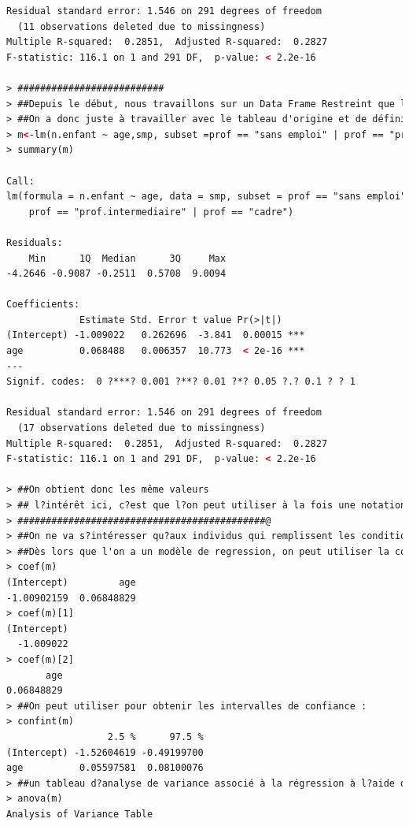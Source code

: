 \begin{lstlisting}[language=html]
Residual standard error: 1.546 on 291 degrees of freedom
  (11 observations deleted due to missingness)
Multiple R-squared:  0.2851,  Adjusted R-squared:  0.2827 
F-statistic: 116.1 on 1 and 291 DF,  p-value: < 2.2e-16

> ##########################
> ##Depuis le début, nous travaillons sur un Data Frame Restreint que l'on a obtenu avec la fonction subset. La fonction lm() permet de réduire directement le Data Frame :
> ##On a donc juste à travailler avec le tableau d'origine et de définir les options de filtre que l'on souhaite appliquer :
> m<-lm(n.enfant ~ age,smp, subset =prof == "sans emploi" | prof == "prof.intermediaire" | prof == "cadre")
> summary(m)

Call:
lm(formula = n.enfant ~ age, data = smp, subset = prof == "sans emploi" | 
    prof == "prof.intermediaire" | prof == "cadre")

Residuals:
    Min      1Q  Median      3Q     Max 
-4.2646 -0.9087 -0.2511  0.5708  9.0094 

Coefficients:
             Estimate Std. Error t value Pr(>|t|)    
(Intercept) -1.009022   0.262696  -3.841  0.00015 ***
age          0.068488   0.006357  10.773  < 2e-16 ***
---
Signif. codes:  0 ?***? 0.001 ?**? 0.01 ?*? 0.05 ?.? 0.1 ? ? 1

Residual standard error: 1.546 on 291 degrees of freedom
  (17 observations deleted due to missingness)
Multiple R-squared:  0.2851,  Adjusted R-squared:  0.2827 
F-statistic: 116.1 on 1 and 291 DF,  p-value: < 2.2e-16

> ##On obtient donc les même valeurs
> ## l?intérêt ici, c?est que l?on peut utiliser à la fois une notation par formule, on décrit la relation entre le nombre d?enfants qui est la variable de réponse et l?âge qui est la variable explicative, ces variables se trouvent dans le data-frame qui s?appelle smp. Par contre ce data-frame-là va être filtré selon les critères qui sont indiqués (dans la commande) dans l?option subset.
> ############################################@
> ##On ne va s?intéresser qu?aux individus qui remplissent les conditions profession égal soit sans emploi, soit profession intermédiaire, soit cadre.
> ##Dès lors que l'on a un modèle de regression, on peut utiliser la commande coef pour afficher ces derniers :
> coef(m)
(Intercept)         age 
-1.00902159  0.06848829 
> coef(m)[1]
(Intercept) 
  -1.009022 
> coef(m)[2]
       age 
0.06848829 
> ##On peut utiliser pour obtenir les intervalles de confiance :
> confint(m)
                  2.5 %      97.5 %
(Intercept) -1.52604619 -0.49199700
age          0.05597581  0.08100076
> ##un tableau d?analyse de variance associé à la régression à l?aide de la commande anova() :
> anova(m)
Analysis of Variance Table


\end{lstlisting}
